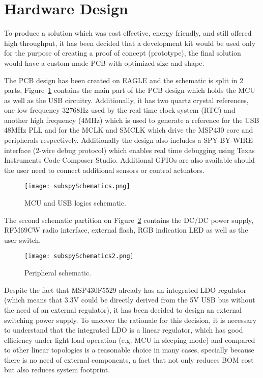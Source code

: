 \documentclass[12pt]{article}
\begin{document}
\newpage
\section{Hardware Design}
\label{hardwareDesign}
To produce a solution which was cost effective, energy friendly, and still offered high throughput, it has been decided that a development kit would be used only for the purpose of creating a proof of concept (prototype), the final solution would have a custom made PCB with optimized size and shape.

The PCB design has been created on EAGLE and the schematic is split in 2 parts, Figure~\ref{fig:subspySchematics} contains the main part of the PCB design which holds the MCU as well as the USB circuitry. Additionally, it has two quartz crystal references, one low frequency 32768Hz used by the real time clock system (RTC) and another high frequency (4MHz) which is used to generate a reference for the USB 48MHz PLL and for the MCLK and SMCLK which drive the MSP430 core and peripherals respectively. Additionally the design also includes a SPY-BY-WIRE interface (2-wire debug protocol) which enables real time debugging using Texas Instruments Code Composer Studio. Additional GPIOs are also available should the user need to connect additional sensors or control actuators.

\begin{figure}[H]
    \centering
    \texttt{[image: subspySchematics.png]}
    \caption{MCU and USB logics schematic.}
    \label{fig:subspySchematics}
\end{figure}

\newpage
The second schematic partition on Figure~\ref{fig:subspySchematics2} contains the DC/DC power supply, RFM69CW radio interface, external flash, RGB indication LED as well as the user switch.

\begin{figure}[H]
    \centering
    \texttt{[image: subspySchematics2.png]}
    \caption{Peripheral schematic.}
    \label{fig:subspySchematics2}
\end{figure}

\newpage
Despite the fact that MSP430F5529 already has an integrated LDO regulator (which means that 3.3V could be directly derived from the 5V USB bus without the need of an external regulator), it has been decided to design an external switching power supply.
To uncover the rationale for this decision, it is necessary to understand that the integrated LDO is a linear regulator, which has good efficiency under light load operation (e.g. MCU in sleeping mode) and compared to other linear topologies is a reasonable choice in many cases, specially because there is no need of external components, a fact that not only reduces BOM cost but also reduces system footprint. 
\end{document}
